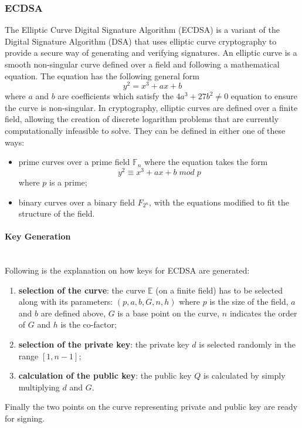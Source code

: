 \subsubsection{ECDSA}
The Elliptic Curve Digital Signature Algorithm (ECDSA) is a variant of the Digital Signature Algorithm (DSA) that uses elliptic curve cryptography to provide a secure way of generating and verifying signatures. An elliptic curve is a smooth \gls{non-singular} curve defined over a field and following a mathematical equation. The equation has the following general form 
\[y^2 = x^3 + ax + b\] 
where $a$ and $b$ are coefficients which satisfy the $4a^3 + 27b^2 \neq 0$ equation to ensure the curve is \gls{non-singular}. 
In cryptography, elliptic curves are defined over a finite field, allowing the creation of discrete logarithm problems that are currently computationally infeasible to solve. They can be defined in either one of these ways:
\begin{itemize}
    \item prime curves over a prime field $\mathbb{F}_n$ where the equation takes the form 
    \[y^2 \equiv x^3 + ax + b \; mod \; p\]
    where $p$ is a prime;
    \item binary curves over a binary field $F_{2^n}$, with the equations modified to fit the structure of the field.
\end{itemize}
\cite{ecdsa}
\paragraph{Key Generation} \mbox{}\\
Following is the explanation on how keys for ECDSA are generated:
\begin{enumerate}[itemsep=-0.1em,topsep=2mm]
    \item \textbf{selection of the curve}: the curve $\mathbb{E}$ (on a finite field) has to be selected along with its parameters: $(p,a,b,G,n,h)$ where $p$ is the size of the field, $a$ and $b$ are defined above, $G$ is a base point on the curve, $n$ indicates the order of $G$ and $h$ is the co-factor;
    \item \textbf{selection of the private key}: the private key $d$ is selected randomly in the range $[1, n - 1]$;
    \item \textbf{calculation of the public key}: the public key $Q$ is calculated by simply multiplying $d$ and $G$.
\end{enumerate}
Finally the two points on the curve representing private and public key are ready for signing. \cite{ecdsa} \cite{rfc6979-ecdsa}

